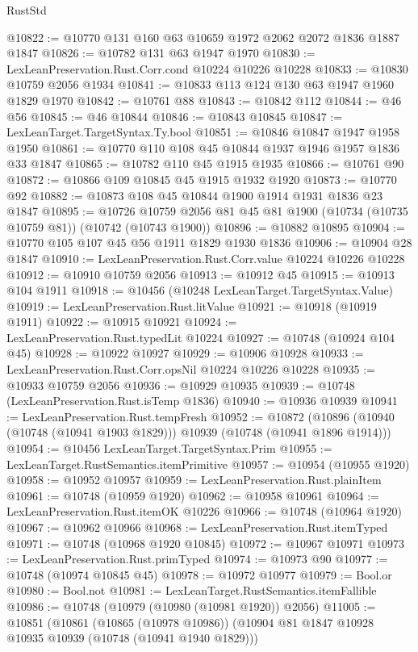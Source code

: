 \begin{lexlean}{RustStd}
\begin{coremodule}
{\begin{coremodule}
{{{{{@10822 := @10770 @131 @160 @63 @10659 @1972 @2062 @2072 @1836 @1887 @1847
@10826 := @10782 @131 @63 @1947 @1970
@10830 := LexLeanPreservation.Rust.Corr.cond @10224 @10226 @10228
@10833 := @10830 @10759 @2056 @1934
@10841 := @10833 @113 @124 @130 @63 @1947 @1960 @1829 @1970
@10842 := @10761 @88
@10843 := @10842 @112
@10844 := @46 @56
@10845 := @46 @10844
@10846 := @10843 @10845
@10847 := LexLeanTarget.TargetSyntax.Ty.bool
@10851 := @10846 @10847 @1947 @1958 @1950
@10861 := @10770 @110 @108 @45 @10844 @1937 @1946 @1957 @1836 @33 @1847
@10865 := @10782 @110 @45 @1915 @1935
@10866 := @10761 @90
@10872 := @10866 @109 @10845 @45 @1915 @1932 @1920
@10873 := @10770 @92
@10882 := @10873 @108 @45 @10844 @1900 @1914 @1931 @1836 @23 @1847
@10895 := @10726 @10759 @2056 @81 @45 @81 @1900 (@10734 (@10735 @10759 @81)) (@10742 (@10743 @1900))
@10896 := @10882 @10895
@10904 := @10770 @105 @107 @45 @56 @1911 @1829 @1930 @1836
@10906 := @10904 @28 @1847
@10910 := LexLeanPreservation.Rust.Corr.value @10224 @10226 @10228
@10912 := @10910 @10759 @2056
@10913 := @10912 @45
@10915 := @10913 @104 @1911
@10918 := @10456 (@10248 LexLeanTarget.TargetSyntax.Value)
@10919 := LexLeanPreservation.Rust.litValue
@10921 := @10918 (@10919 @1911)
@10922 := @10915 @10921
@10924 := LexLeanPreservation.Rust.typedLit @10224
@10927 := @10748 (@10924 @104 @45)
@10928 := @10922 @10927
@10929 := @10906 @10928
@10933 := LexLeanPreservation.Rust.Corr.opsNil @10224 @10226 @10228
@10935 := @10933 @10759 @2056
@10936 := @10929 @10935
@10939 := @10748 (LexLeanPreservation.Rust.isTemp @1836)
@10940 := @10936 @10939
@10941 := LexLeanPreservation.Rust.tempFresh
@10952 := @10872
    (@10896 (@10940 (@10748 (@10941 @1903 @1829))) @10939 (@10748 (@10941 @1896 @1914)))
@10954 := @10456 LexLeanTarget.TargetSyntax.Prim
@10955 := LexLeanTarget.RustSemantics.itemPrimitive
@10957 := @10954 (@10955 @1920)
@10958 := @10952 @10957
@10959 := LexLeanPreservation.Rust.plainItem
@10961 := @10748 (@10959 @1920)
@10962 := @10958 @10961
@10964 := LexLeanPreservation.Rust.itemOK @10226
@10966 := @10748 (@10964 @1920)
@10967 := @10962 @10966
@10968 := LexLeanPreservation.Rust.itemTyped
@10971 := @10748 (@10968 @1920 @10845)
@10972 := @10967 @10971
@10973 := LexLeanPreservation.Rust.primTyped
@10974 := @10973 @90
@10977 := @10748 (@10974 @10845 @45)
@10978 := @10972 @10977
@10979 := Bool.or
@10980 := Bool.not
@10981 := LexLeanTarget.RustSemantics.itemFallible
@10986 := @10748 (@10979 (@10980 (@10981 @1920)) @2056)
@11005 := @10851
    (@10861
      (@10865 (@10978 @10986))
      (@10904 @81 @1847 @10928 @10935 @10939 (@10748 (@10941 @1940 @1829)))
}}}}}
\end{coremodule}}
\end{coremodule}
\end{lexlean}
